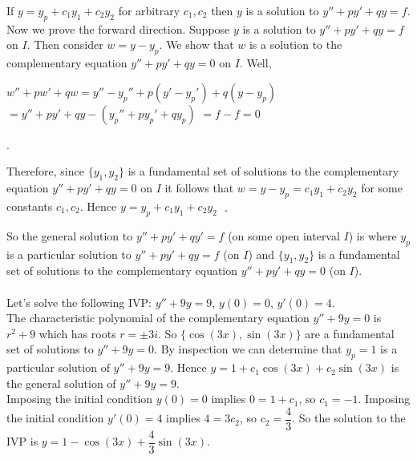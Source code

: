 \documentclass{ximera}
\begin{document}
 If $y=y_{p}+c_{1}y_{1}+c_{2}y_{2}$ for arbitrary $c_{1},c_{2}$ then $y$ is a solution to $y''+py'+qy=f$.\\

 Now we prove the forward direction.  Suppose $y$ is a solution to  $y''+py'+qy=f$ on $I$.  Then consider $w=y-y_{p}$.  We show that $w$ is a solution to the complementary equation  $y''+py'+qy=0$ on $I$.  Well, \\ \begin{small}$w''+pw'+qw=y''-y_{p}''+p(y'-y_{p}')+q(y-y_{p})$ $=y''+py'+qy-(y_{p}''+py_{p}'+qy_{p})$ $=f-f=0$\end{small}.

\newpage


Therefore, since $\{y_1,y_2\}$ is a fundamental set of solutions to the complementary equation $y''+py'+qy=0$ on $I$ it follows that $w=y-y_p=c_1y_1+c_2y_2$ for some constants $c_1,c_2$.  Hence $y=y_p+c_1y_1+c_2y_2\mbox{ }_{\square}$


So the general solution to $y''+py'+qy'=f$ (on some open interval $I$) is  where $y_p$ is a particular solution to $y''+py'+qy=f$ (on $I$) and $\{y_1,y_2\}$ is a fundamental set of solutions to the complementary equation $y''+py'+qy=0$ (on $I$).\\ \\

 Let's solve the following IVP:  $y''+9y=9$, $y(0)=0$, $y'(0)=4$.\\

 The characteristic polynomial of the complementary equation $y''+9y=0$ is $r^{2}+9$ which has roots $r=\pm 3i$.  So $\{\cos{(3x)},\sin{(3x)}\}$ are a fundamental set of solutions to $y''+9y=0$.  By inspection we can determine that $y_{p}=1$ is a particular solution of $y''+9y=9$.  Hence $y=1+c_{1}\cos{(3x)}+c_{2}\sin{(3x)}$ is the general solution of $y''+9y=9$.\\

Imposing the initial condition $y(0)=0$ implies $0=1+c_{1}$, so $c_{1}=-1$.  Imposing the initial condition $y'(0)=4$ implies $4=3c_{2}$, so $c_{2}=\dfrac{4}{3}$.  So the solution to the IVP is $y=1-\cos{(3x)}+\dfrac{4}{3}\sin{(3x)}$.
\end{document}
